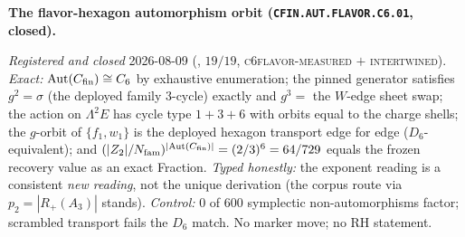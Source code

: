 \par\smallskip\noindent\textbf{The flavor-hexagon automorphism
orbit (\texttt{CFIN.AUT.\allowbreak FLAVOR.C6.01}, closed).}
{\sloppy
\emph{Registered and closed} 2026-08-09
(, $19/19$,
\textsc{c6flavor-measured} $+$ \textsc{intertwined}).
\emph{Exact:} $\mathrm{Aut}(C_{\rm fin}) \cong C_6$ by
exhaustive enumeration; the pinned generator satisfies $g^2 =
\sigma$ (the deployed family $3$-cycle) exactly and $g^3 =$ the
$W$-edge sheet swap; the action on $\Lambda^2 E$ has cycle type
$1 + 3 + 6$ with orbits equal to the charge shells; the
$g$-orbit of $\{f_1, w_1\}$ is the deployed hexagon transport
edge for edge ($D_6$-equivalent); and $(|Z_2|/N_{\mathrm{fam}})^{|
\mathrm{Aut}(C_{\rm fin})|} = (2/3)^6 = 64/729$ equals the
frozen recovery value as an exact Fraction.  \emph{Typed
honestly:} the exponent reading is a consistent \emph{new
reading}, not the unique derivation (the corpus route via $p_2
= |R_+(A_3)|$ stands).  \emph{Control:} $0$ of $600$ symplectic
non-automorphisms factor; scrambled transport fails the $D_6$
match.  No marker move; no RH statement.\par}

